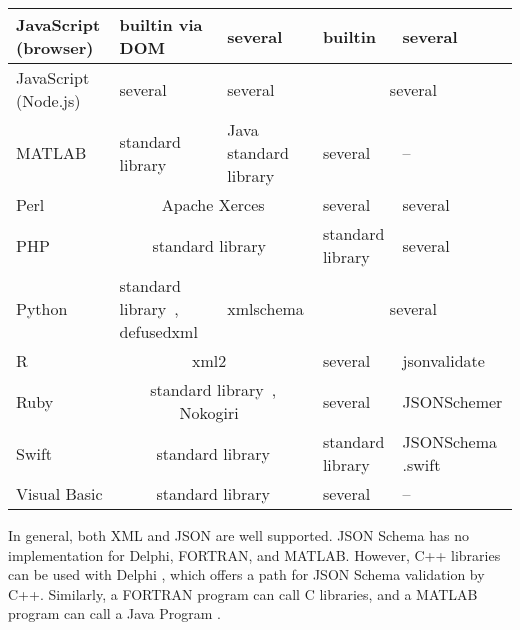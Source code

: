 \documentclass[11pt,a4paper]{article}
\begin{document}
\begin{longtable}[h!]{|p{30mm}|p{25mm}|p{20mm}|p{25mm}|p{25mm}|}
\hline
JavaScript (browser) & builtin via DOM \cite{w3schools-xml-dom} & several \cite{npm-xsd} & builtin & several \cite{jsonschema-implementations} \\
\hline
JavaScript (Node.js) & several \cite{npm-xml} & several \cite{npm-xsd} & \multicolumn{2}{c|}{ several \cite{json, jsonschema-implementations} } \\
\hline
MATLAB & standard library \cite{matlab-xml} & Java standard library \cite{matlab-xsd} & several \cite{json} & -- \\
\hline
Perl & \multicolumn{2}{c|}{Apache Xerces \cite{xerces-perl}} & several \cite{perl-json} & several \cite{jsonschema-implementations} \\
\hline
PHP & \multicolumn{2}{c|}{standard library~\cite{php-xml}} & standard library \cite{php-json} &
several \cite{jsonschema-implementations} \\
\hline
Python & standard library~\cite{python-library-xml}, defusedxml~\cite{defusedxml} & xmlschema \cite{xmlschema-python} & \multicolumn{2}{c|}{ several \cite{json, jsonschema-implementations} } \\
\hline
R & \multicolumn{2}{c|}{xml2~\cite{r-xml2}} & several \cite{json} & jsonvalidate \cite{r-jsonvalidate} \\
\hline
Ruby & \multicolumn{2}{c|}{ standard library~\cite{ruby-xml}, Nokogiri~\cite{nokogiri}} & several \cite{json} & JSONSchemer \cite{jsonschemer, jsonschema-implementations} \\
\hline
Swift & \multicolumn{2}{c|}{standard library \cite{swift-xml}} & standard library \cite{swift-json} & JSONSchema .swift \cite{swift-jsonschema} \\
\hline
Visual Basic & \multicolumn{2}{c|}{standard library \cite{visualbasic-xml-validation, visualbasic-xml}} & several \cite{json} & -- \\
\hline
\end{longtable}

In general, both XML and JSON are well supported. JSON Schema has no
implementation for Delphi, FORTRAN, and MATLAB. However, C++ libraries can be
used with Delphi \cite{delphi-c++}, which offers a path for JSON Schema
validation by C++. Similarly, a FORTRAN program can call C libraries, and a
MATLAB program can call a Java Program \cite{fortran-iso-c-binding,
matlab-java}.


%
%

\printbibliography %
\end{document}
